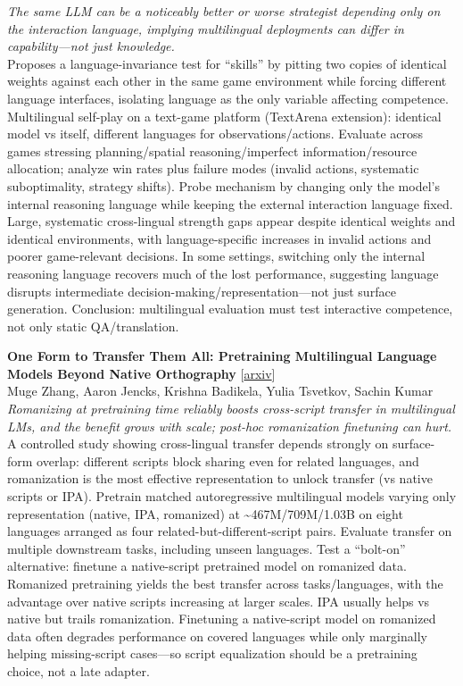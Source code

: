 \documentclass[12pt,letterpaper]{article}
\begin{document}
{\small\textit{The same LLM can be a noticeably better or worse strategist depending only on the interaction language, implying multilingual deployments can differ in capability---not just knowledge.}}\\[1pt]
{\footnotesize Proposes a language-invariance test for ``skills'' by pitting two copies of identical weights against each other in the same game environment while forcing different language interfaces, isolating language as the only variable affecting competence. Multilingual self-play on a text-game platform (TextArena extension): identical model vs itself, different languages for observations/actions. Evaluate across games stressing planning/spatial reasoning/imperfect information/resource allocation; analyze win rates plus failure modes (invalid actions, systematic suboptimality, strategy shifts). Probe mechanism by changing only the model's internal reasoning language while keeping the external interaction language fixed. Large, systematic cross-lingual strength gaps appear despite identical weights and identical environments, with language-specific increases in invalid actions and poorer game-relevant decisions. In some settings, switching only the internal reasoning language recovers much of the lost performance, suggesting language disrupts intermediate decision-making/representation---not just surface generation. Conclusion: multilingual evaluation must test interactive competence, not only static QA/translation.}

\medskip

{\small\textbf{One Form to Transfer Them All: Pretraining Multilingual Language Models Beyond Native Orthography}} {\scriptsize[\href{https://arxiv.org/abs/2608.25904}{arxiv}]}\\
{\scriptsize Muge Zhang, Aaron Jencks, Krishna Badikela, Yulia Tsvetkov, Sachin Kumar}\\

{\small\textit{Romanizing at pretraining time reliably boosts cross-script transfer in multilingual LMs, and the benefit grows with scale; post-hoc romanization finetuning can hurt.}}\\[1pt]
{\footnotesize A controlled study showing cross-lingual transfer depends strongly on surface-form overlap: different scripts block sharing even for related languages, and romanization is the most effective representation to unlock transfer (vs native scripts or IPA). Pretrain matched autoregressive multilingual models varying only representation (native, IPA, romanized) at \textasciitilde{}467M/709M/1.03B on eight languages arranged as four related-but-different-script pairs. Evaluate transfer on multiple downstream tasks, including unseen languages. Test a ``bolt-on'' alternative: finetune a native-script pretrained model on romanized data. Romanized pretraining yields the best transfer across tasks/languages, with the advantage over native scripts increasing at larger scales. IPA usually helps vs native but trails romanization. Finetuning a native-script model on romanized data often degrades performance on covered languages while only marginally helping missing-script cases---so script equalization should be a pretraining choice, not a late adapter.}
\end{document}
